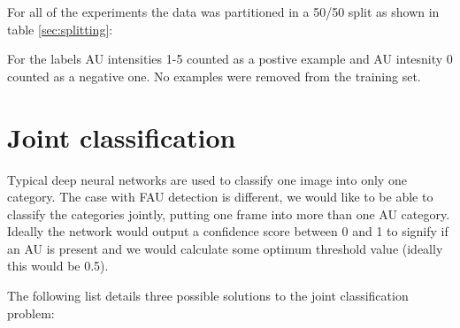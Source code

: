     For all of the experiments the data was partitioned in a 50/50 split as shown in table \ref{sec:splitting}:
    \begin{table}[h!]
    \end{table}

    For the labels AU intensities 1-5 counted as a postive example and AU intesnity 0 counted as a negative one.
    No examples were removed from the training set.


  \section{Joint classification}

    Typical deep neural networks are used to classify
    one image into only one category. The case with FAU detection is different, we
    would like to be able to classify the categories jointly,  putting one frame into more than
    one AU category. Ideally the network would output a confidence score between 0 and 1
    to signify if an AU is present and we would calculate some optimum threshold value
    (ideally this would be 0.5).

    The following list details three possible solutions to the joint classification problem:

